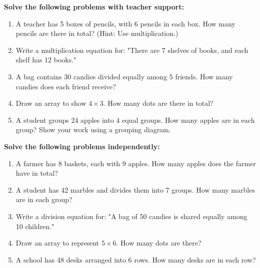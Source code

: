 \documentclass[12pt]{article}
\begin{document}
\vspace{1em}



\begin{tcolorbox}[colframe=black!60, colback=white, 
coltitle=black, colbacktitle=black!15, fonttitle=\bfseries\Large, 
title=Guided Practice, halign title=center, left=10pt, right=10pt, top=10pt, bottom=80pt]
\textbf{Solve the following problems with teacher support:}
\begin{enumerate}[itemsep=5em] %
    \item A teacher has 5 boxes of pencils, with 6 pencils in each box. How many pencils are there in total? (Hint: Use multiplication.)
    \item Write a multiplication equation for: "There are 7 shelves of books, and each shelf has 12 books."
    \item A bag contains 30 candies divided equally among 5 friends. How many candies does each friend receive?
    \item Draw an array to show \( 4 \times 3 \). How many dots are there in total?
    \item A student groups 24 apples into 4 equal groups. How many apples are in each group? Show your work using a grouping diagram.
\end{enumerate}
\end{tcolorbox}

\vspace{1em}



\begin{tcolorbox}[colframe=black!60, colback=white, 
coltitle=black, colbacktitle=black!15, fonttitle=\bfseries\Large, 
title=Independent Practice, halign title=center, left=10pt, right=10pt, top=10pt, bottom=60pt]
\textbf{Solve the following problems independently:}
\begin{enumerate}[itemsep=5em] %
    \item A farmer has 8 baskets, each with 9 apples. How many apples does the farmer have in total?
    \item A student has 42 marbles and divides them into 7 groups. How many marbles are in each group?
    \item Write a division equation for: "A bag of 50 candies is shared equally among 10 children."
    \item Draw an array to represent \( 5 \times 6 \). How many dots are there?
    \item A school has 48 desks arranged into 6 rows. How many desks are in each row?
\end{enumerate}
\end{tcolorbox}
\end{document}
